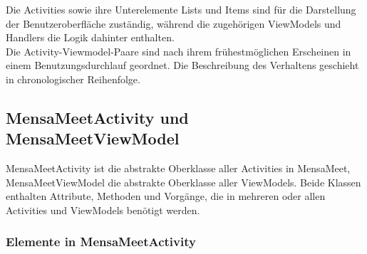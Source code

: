 \documentclass[a4paper]{scrreprt}
\begin{document}
Die Activities sowie ihre Unterelemente Lists und Items sind für die Darstellung der Benutzeroberfläche zuständig, während die zugehörigen ViewModels und Handlers die Logik dahinter enthalten. \\

Die Activity-Viewmodel-Paare sind nach ihrem frühestmöglichen Erscheinen in einem Benutzungsdurchlauf geordnet. Die Beschreibung des Verhaltens geschieht in chronologischer Reihenfolge. \\

\subsection{MensaMeetActivity und MensaMeetViewModel} 
MensaMeetActivity ist die abstrakte Oberklasse aller Activities in MensaMeet, MensaMeetViewModel die abstrakte Oberklasse aller ViewModels. Beide Klassen enthalten Attribute, Methoden und Vorgänge, die in mehreren oder allen Activities und ViewModels benötigt werden. \\
 \subsubsection{Elemente in MensaMeetActivity} 
 
\end{document}
